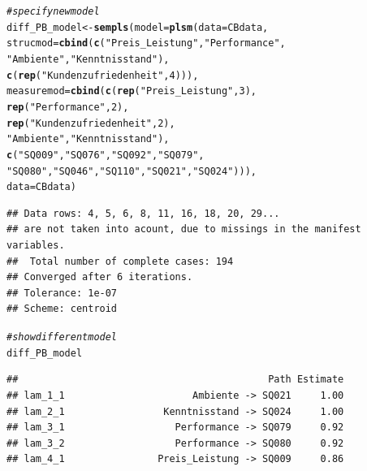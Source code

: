 \documentclass{article}\usepackage[]{graphicx}\usepackage[]{color}
\makeatletter
\newcommand{\hlnum}[1]{\textcolor[rgb]{0.686,0.059,0.569}{#1}}%
\newcommand{\hlstr}[1]{\textcolor[rgb]{0.192,0.494,0.8}{#1}}%
\newcommand{\hlcom}[1]{\textcolor[rgb]{0.678,0.584,0.686}{\textit{#1}}}%
\newcommand{\hlstd}[1]{\textcolor[rgb]{0.345,0.345,0.345}{#1}}%
\newcommand{\hlkwb}[1]{\textcolor[rgb]{0.69,0.353,0.396}{#1}}%
\newcommand{\hlkwc}[1]{\textcolor[rgb]{0.333,0.667,0.333}{#1}}%
\newcommand{\hlkwd}[1]{\textcolor[rgb]{0.737,0.353,0.396}{\textbf{#1}}}%
\newenvironment{kframe}{%
 \def\at@end@of@kframe{}%
 \ifinner\ifhmode%
  \def\at@end@of@kframe{\end{minipage}}%
  \begin{minipage}{\columnwidth}%
 \fi\fi%
 \def\FrameCommand##1{\hskip\@totalleftmargin \hskip-\fboxsep
 \colorbox{shadecolor}{##1}\hskip-\fboxsep
     \hskip-\linewidth \hskip-\@totalleftmargin \hskip\columnwidth}%
 \MakeFramed {\advance\hsize-\width
   \@totalleftmargin\z@ \linewidth\hsize
   \@setminipage}}%
 {\par\unskip\endMakeFramed%
 \at@end@of@kframe}
\newenvironment{knitrout}{}{} %
\makeatother
\begin{document}
\begin{knitrout}
\color{fgcolor}\begin{kframe}
\begin{alltt}
\hlcom{#specify new model}
\hlstd{diff_PB_model} \hlkwb{<-} \hlkwd{sempls}\hlstd{(}\hlkwc{model} \hlstd{=} \hlkwd{plsm}\hlstd{(}\hlkwc{data} \hlstd{= CBdata,}
                        \hlkwc{strucmod} \hlstd{=} \hlkwd{cbind}\hlstd{(}\hlkwd{c}\hlstd{(}\hlstr{"Preis_Leistung"}\hlstd{,}\hlstr{"Performance"}\hlstd{,}
                                           \hlstr{"Ambiente"}\hlstd{,}\hlstr{"Kenntnisstand"}\hlstd{),}
                                         \hlkwd{c}\hlstd{(}\hlkwd{rep}\hlstd{(}\hlstr{"Kundenzufriedenheit"}\hlstd{,}\hlnum{4}\hlstd{))),}
                        \hlkwc{measuremod} \hlstd{=} \hlkwd{cbind}\hlstd{(}\hlkwd{c}\hlstd{(}\hlkwd{rep}\hlstd{(}\hlstr{"Preis_Leistung"}\hlstd{,}\hlnum{3}\hlstd{),}
                                             \hlkwd{rep}\hlstd{(}\hlstr{"Performance"}\hlstd{,}\hlnum{2}\hlstd{),}
                                             \hlkwd{rep}\hlstd{(}\hlstr{"Kundenzufriedenheit"}\hlstd{,}\hlnum{2}\hlstd{),}
                                             \hlstr{"Ambiente"}\hlstd{,}\hlstr{"Kenntnisstand"}\hlstd{),}
                                           \hlkwd{c}\hlstd{(}\hlstr{"SQ009"}\hlstd{,}\hlstr{"SQ076"}\hlstd{,}\hlstr{"SQ092"}\hlstd{,}\hlstr{"SQ079"}\hlstd{,}
                                             \hlstr{"SQ080"}\hlstd{,}\hlstr{"SQ046"}\hlstd{,}\hlstr{"SQ110"}\hlstd{,}\hlstr{"SQ021"}\hlstd{,}\hlstr{"SQ024"}\hlstd{))),}
                        \hlkwc{data} \hlstd{= CBdata)}
\end{alltt}
\begin{verbatim}
## Data rows: 4, 5, 6, 8, 11, 16, 18, 20, 29...
## are not taken into acount, due to missings in the manifest variables.
##  Total number of complete cases: 194 
## Converged after 6 iterations.
## Tolerance: 1e-07
## Scheme: centroid
\end{verbatim}
\begin{alltt}
\hlcom{#show different model}
\hlstd{diff_PB_model}
\end{alltt}
\begin{verbatim}
##                                           Path Estimate
## lam_1_1                      Ambiente -> SQ021     1.00
## lam_2_1                 Kenntnisstand -> SQ024     1.00
## lam_3_1                   Performance -> SQ079     0.92
## lam_3_2                   Performance -> SQ080     0.92
## lam_4_1                Preis_Leistung -> SQ009     0.86

\end{verbatim}
\end{kframe}
\end{knitrout}
\end{document}
